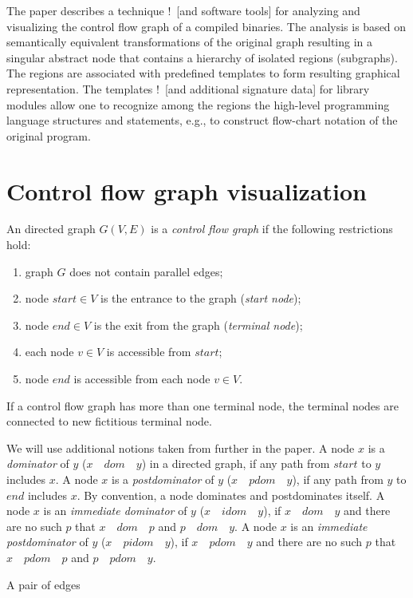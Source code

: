 \documentclass[conference]{IEEEtran}
\newcommand{\nnn}[2][ncolor]{\noindent%
\textcolor{eclr}{!\ [}\textcolor{#1}{#2}\textcolor{eclr}{]}}
\begin{document}
The paper describes a technique \nnn{and software tools} for analyzing and visualizing the control flow graph of a compiled binaries.  The analysis is based on semantically equivalent transformations of the original graph resulting in a singular abstract node that contains a hierarchy of isolated regions (subgraphs).  The regions are associated with predefined templates to form resulting graphical representation.  The templates \nnn{and additional signature data} for library modules allow one to recognize among the regions the high-level programming language structures and statements, e.g., to construct flow-chart notation of the original program.

\section{Control flow graph visualization}

An directed graph $G(V,E)$ is a \emph{control flow graph} if the following restrictions hold:
\begin{enumerate}
\item graph $G$ does not contain parallel edges;
\item node $start\in V$ is the entrance to the graph (\emph{start node});
\item node $end \in V$ is the exit from the graph (\emph{terminal node});
\item each node $v \in V$ is accessible from $start$;
\item node $end$ is accessible from each node $v \in V$.
\end{enumerate}
If a control flow graph has more than one terminal node, the terminal nodes are connected to new fictitious terminal node.

We will use additional notions taken from \cite{sese} further in the paper.  A node $x$ is a \emph{dominator} of $y$ ($x\quad dom\quad y$) in a directed graph, if any path from $start$ to $y$ includes $x$.  A node $x$ is a \emph{postdominator} of $y$ ($x\quad pdom\quad y$), if any path from $y$ to $end$ includes $x$.  By convention, a node dominates and postdominates itself.  A node $x$ is an \emph{immediate dominator} of $y$ ($x\quad idom\quad y$), if $x\quad dom\quad y$ and there are no such $p$ that $x\quad dom\quad p$ and $p\quad dom\quad y$.  A node $x$ is an \emph{immediate postdominator} of $y$ ($x\quad pidom\quad y$), if $x\quad pdom\quad y$ and there are no such $p$ that $x\quad pdom\quad p$ and $p\quad pdom\quad y$.

A pair of edges
\end{document}

